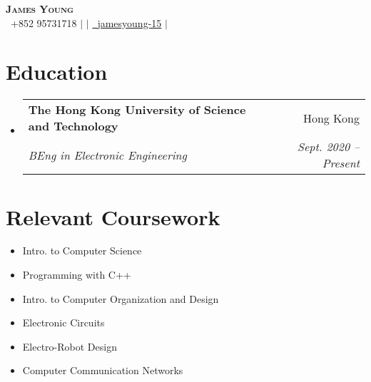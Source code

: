 \documentclass[letterpaper,12pt]{article}
\makeatletter
\newcommand{\resumeSubheading}[4]{
  \vspace{-2pt}\item
    \begin{tabular*}{0.97\textwidth}[t]{l@{\extracolsep{\fill}}r}
      \textbf{#1} & #2 \\
      \textit{\small#3} & \textit{\small #4} \\
    \end{tabular*}\vspace{-7pt}
}
\newcommand{\resumeSubHeadingListStart}{\begin{itemize}[leftmargin=0.15in, label={}]}
\newcommand{\resumeSubHeadingListEnd}{\end{itemize}}
\makeatother
\begin{document}
\begin{center}
    \textbf{\Huge \scshape James Young} \\ \vspace{2pt}
    \small  \faPhone\ {+852 95731718} $|$ 
    \href{mailto:jyyoungaa@connect.ust.hk}{} $|$ 
    \href{https://github.com/jamesyoung-15} {\faGithub\ {jamesyoung-15}} $|$
    \href{https://linkedin.com/in/jamesyyoung}{}
\end{center}


\section{Education}
  \resumeSubHeadingListStart
    \resumeSubheading
      {The Hong Kong University of Science and Technology}{Hong Kong}
      {BEng in Electronic Engineering}{Sept. 2020 -- Present}
  \resumeSubHeadingListEnd

\section{Relevant Coursework}
\vspace{-12pt}
    \begin{multicols}{2}
        \begin{itemize}[itemsep=-1pt, parsep=3pt]
        \small
            \item Intro. to Computer Science
            \item Programming with C++
            \item Intro. to Computer Organization and Design
            \item Electronic Circuits
            \item Electro-Robot Design
            \item Computer Communication Networks
        \end{itemize}
    \end{multicols}


\end{document}
